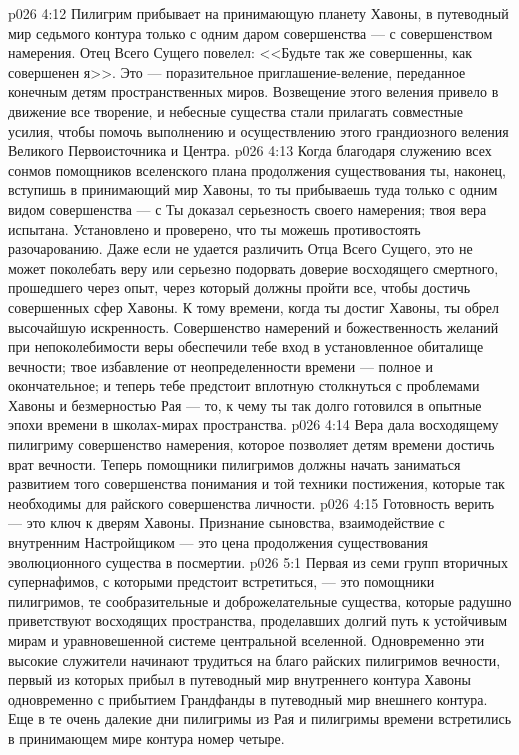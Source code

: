 \vs p026 4:12 Пилигрим прибывает на принимающую планету Хавоны, в путеводный мир седьмого контура только с одним даром совершенства --- с совершенством намерения. Отец Всего Сущего повелел: <<Будьте так же совершенны, как совершенен я>>. Это --- поразительное приглашение\hyp{}веление, переданное конечным детям пространственных миров. Возвещение этого веления привело в движение все творение, и небесные существа стали прилагать совместные усилия, чтобы помочь выполнению и осуществлению этого грандиозного веления Великого Первоисточника и Центра.
\vs p026 4:13 Когда благодаря служению всех сонмов помощников вселенского плана продолжения существования ты, наконец, вступишь в принимающий мир Хавоны, то ты прибываешь туда только с одним видом совершенства --- с  Ты доказал серьезность своего намерения; твоя вера испытана. Установлено и проверено, что ты можешь противостоять разочарованию. Даже если не удается различить Отца Всего Сущего, это не может поколебать веру или серьезно подорвать доверие восходящего смертного, прошедшего через опыт, через который должны пройти все, чтобы достичь совершенных сфер Хавоны. К тому времени, когда ты достиг Хавоны, ты обрел высочайшую искренность. Совершенство намерений и божественность желаний при непоколебимости веры обеспечили тебе вход в установленное обиталище вечности; твое избавление от неопределенности времени --- полное и окончательное; и теперь тебе предстоит вплотную столкнуться с проблемами Хавоны и безмерностью Рая --- то, к чему ты так долго готовился в опытные эпохи времени в школах\hyp{}мирах пространства.
\vs p026 4:14 Вера дала восходящему пилигриму совершенство намерения, которое позволяет детям времени достичь врат вечности. Теперь помощники пилигримов должны начать заниматься развитием того совершенства понимания и той техники постижения, которые так необходимы для райского совершенства личности.
\vs p026 4:15  Готовность верить --- это ключ к дверям Хавоны. Признание сыновства, взаимодействие с внутренним Настройщиком --- это цена продолжения существования эволюционного существа в посмертии.
\vs p026 5:1 Первая из семи групп вторичных супернафимов, с которыми предстоит встретиться, --- это помощники пилигримов, те сообразительные и доброжелательные существа, которые радушно приветствуют восходящих пространства, проделавших долгий путь к устойчивым мирам и уравновешенной системе центральной вселенной. Одновременно эти высокие служители начинают трудиться на благо райских пилигримов вечности, первый из которых прибыл в путеводный мир внутреннего контура Хавоны одновременно с прибытием Грандфанды в путеводный мир внешнего контура. Еще в те очень далекие дни пилигримы из Рая и пилигримы времени встретились в принимающем мире контура номер четыре.

